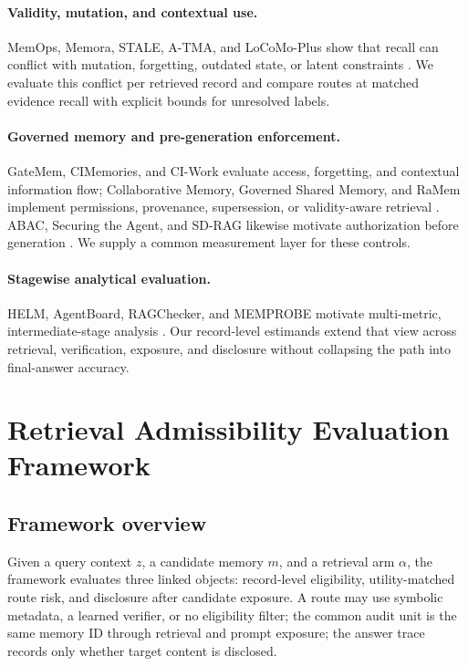\documentclass{article}
\begin{document}
\paragraph{Validity, mutation, and contextual use.}
MemOps, Memora, STALE, A-TMA, and LoCoMo-Plus show that recall can conflict with
mutation, forgetting, outdated state, or latent constraints
\citep{hao2026memops,uddin2026memora,chao2026stale,shi2026atma,li2026locomoplus}.  We evaluate
this conflict per retrieved record and compare routes at matched evidence recall with
explicit bounds for unresolved labels.

\paragraph{Governed memory and pre-generation enforcement.}
GateMem, CIMemories, and CI-Work evaluate access, forgetting, and contextual
information flow;
Collaborative Memory, Governed Shared Memory, and RaMem implement permissions,
provenance, supersession, or validity-aware retrieval
\citep{ren2026gatemem,mireshghallah2026cimemories,fu2026ciwork,rezazadeh2025collaborative,
margalit2026governed,yang2026ramem}.  ABAC, Securing the Agent, and SD-RAG likewise
motivate authorization before generation \citep{hu2019abac,arceo2026securing,
almasoud2026sdrag}.  We supply a common measurement layer for these controls.

\paragraph{Stagewise analytical evaluation.}
HELM, AgentBoard, RAGChecker, and MEMPROBE motivate multi-metric, intermediate-stage
analysis \citep{liang2023helm,ma2024agentboard,ru2024ragchecker,ma2026memprobe}.
Our record-level estimands extend that view across retrieval, verification, exposure,
and disclosure without collapsing the path into final-answer accuracy.


\section{Retrieval Admissibility Evaluation Framework}
\label{sec:framework}

\subsection{Framework overview}

Given a query context $z$, a candidate memory $m$, and a retrieval arm $\alpha$,
the framework evaluates three linked objects: record-level eligibility,
utility-matched route risk, and disclosure after candidate exposure.  A route may use
symbolic metadata, a learned verifier, or no eligibility filter; the common audit
unit is the same memory ID through retrieval and prompt exposure; the answer trace
records only whether target content is disclosed.
\end{document}
